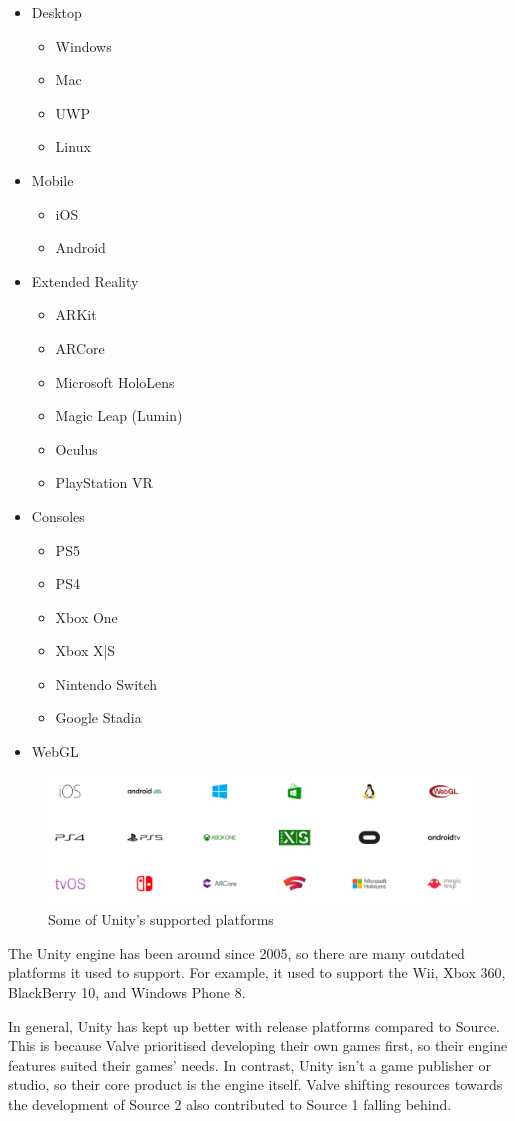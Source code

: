 \documentclass[a4paper, 12pt]{scrartcl}
\begin{document}
\begin{itemize}
  \item Desktop
  \begin{itemize}
    \item Windows
    \item Mac
    \item UWP
    \item Linux
  \end{itemize}
  \item Mobile
  \begin{itemize}
    \item iOS
    \item Android
  \end{itemize}
  \item Extended Reality
  \begin{itemize}
    \item ARKit
    \item ARCore
    \item Microsoft HoloLens
    \item Magic Leap (Lumin)
    \item Oculus
    \item PlayStation VR
  \end{itemize}
  \item Consoles
  \begin{itemize}
    \item PS5
    \item PS4
    \item Xbox One
    \item Xbox X|S
    \item Nintendo Switch
    \item Google Stadia
  \end{itemize}
  \item WebGL
\end{itemize}

\begin{figure}[!htp]
  \centering
  \includegraphics[width=\linewidth]{images/unity_platforms.png}
  \caption{Some of Unity's supported platforms}
  \label{fig:unity_platforms}
\end{figure}

The Unity engine has been around since 2005, so there are many outdated platforms it used to support. For example, it used to support the Wii, Xbox 360, BlackBerry 10, and Windows Phone 8.

In general, Unity has kept up better with release platforms compared to Source. This is because Valve prioritised developing their own games first, so their engine features suited their games' needs. In contrast, Unity isn't a game publisher or studio, so their core product is the engine itself. Valve shifting resources towards the development of Source 2 also contributed to Source 1 falling behind.
\end{document}
